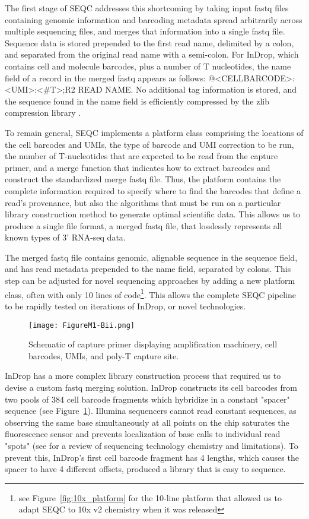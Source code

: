The first stage of SEQC addresses this shortcoming by taking input fastq files containing genomic information and barcoding metadata spread arbitrarily across multiple sequencing files, and merges that information into a single fastq file. 
Sequence data is stored prepended to the first read name, delimited by a colon, and separated from the original read name with a semi-colon.
For InDrop, which contains cell and molecule barcodes, plus a number of T nucleotides, the name field of a record in the merged fastq appears as follows: {\mono @<CELLBARCODE>:<UMI>:<\#T>;R2 READ NAME}.
No additional tag information is stored, and the sequence found in the name field is efficiently compressed by the zlib compression library \citep{Gailly2004}.

To remain general, SEQC implements a platform class comprising the locations of the cell barcodes and UMIs, the type of barcode and UMI correction to be run, the number of T-nucleotides that are expected to be read from the capture primer, and a merge function that indicates how to extract barcodes and construct the standardized merge fastq file. 
Thus, the platform contains the complete information required to specify where to find the barcodes that define a read's provenance, but also the algorithms that must be run on a particular library construction method to generate optimal scientific data. This allows us to produce a single file format, a merged fastq file, that losslessly represents all known types of 3' RNA-seq data. 

The merged fastq file contains genomic, alignable sequence in the sequence field, and has read metadata prepended to the name field, separated by colons. This step can be adjusted for novel sequencing approaches by adding a new platform class, often with only 10 lines of code\footnote{see Figure~\ref{fig:10x_platform} for the 10-line platform that allowed us to adapt SEQC to 10x v2 chemistry when it was released}.
This allows the complete SEQC pipeline to be rapidly tested on iterations of InDrop, or novel technologies.

\begin{figure}
\centering
\texttt{[image: FigureM1-Bii.png]}
\caption{Schematic of capture primer displaying amplification machinery, cell barcodes, UMIs,
         and poly-T capture site.}
\label{fig:m1bii}
\end{figure}

InDrop has a more complex library construction process that required us to devise a custom fastq merging solution.
InDrop constructs its cell barcodes from two pools of 384 cell barcode fragments which hybridize in a constant "spacer" sequence (see Figure~\ref{fig:m1bii}).
Illumina sequencers cannot read constant sequences, as observing the same base simultaneously at all points on the chip saturates the fluorescence sensor and prevents localization of base calls to individual read "spots" (see \cite{Metzker2010} for a review of sequencing technology chemistry and limitations). 
To prevent this, InDrop's first cell barcode fragment has 4 lengths, which causes the spacer to have 4 different offsets, produced a library that is easy to sequence. 

